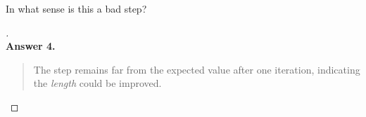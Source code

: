 \documentclass[12pt]{article}
\newenvironment{exercise}[2][Exercise]{\begin{trivlist}
\item[\hskip \labelsep {\bfseries #1}\hskip \labelsep {\bfseries #2.}]}{\end{trivlist}}
\begin{document}
\begin{exercise}{4} In what sense is this a bad step?
\end{exercise} \vspace{-10mm}
\begin{proof}[] \textnormal{ } \\
	\textbf{Answer 4.} \vspace{-7mm} \\
	\begin{quote}
		The step remains far from the expected value after one iteration, indicating the \textit{length} could be improved.
	\end{quote}
\end{proof}
\end{document}
